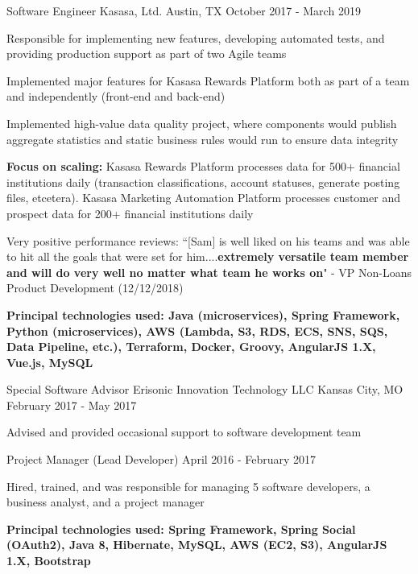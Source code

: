 \begin{cventries}
  \cventry
    {Software Engineer} %
    {Kasasa, Ltd.} %
    {Austin, TX} %
    {October 2017 - March 2019} %
    {
      \begin{cvitems} %
         \item{Responsible for implementing new features, developing automated tests, and providing production support as part of two Agile teams}
 \item{Implemented major features for Kasasa Rewards Platform both as part of a team and independently (front-end and back-end)}
 \item{Implemented high-value data quality project, where components would publish aggregate statistics and static business rules would run to ensure data integrity}
 \item{\textbf{Focus on scaling:} Kasasa Rewards Platform processes data for 500+ financial institutions daily (transaction classifications, account statuses, generate posting files, etcetera). Kasasa Marketing Automation Platform processes customer and prospect data for 200+ financial institutions daily}
 \item{Very positive performance reviews: ``[Sam] is well liked on his teams and was able to hit all the goals that were set for him....\textbf{extremely versatile team member and will do very well no matter what team he works on}" - VP Non-Loans Product Development (12/12/2018)}
 \item{\textbf{Principal technologies used: Java (microservices), Spring Framework, Python (microservices), AWS (Lambda, S3, RDS, ECS, SNS, SQS, Data Pipeline, etc.), Terraform, Docker, Groovy, AngularJS 1.X, Vue.js, MySQL}}
      \end{cvitems}
    }

  \cventry
    {Special Software Advisor} %
    {Erisonic Innovation Technology LLC} %
    {Kansas City, MO} %
    {February 2017 - May 2017} %
    {
      \begin{cvitems} %
       \item {Advised and provided occasional support to software development team}
      \end{cvitems}
    }
    
      \cventry
    {Project Manager (Lead Developer)} %
    {} %
    {} %
    {April 2016 - February 2017} %
    {
      \begin{cvitems} %
         \item{Hired, trained, and was responsible for managing 5 software developers, a business analyst, and a project manager}
 \item{\textbf{Principal technologies used: Spring Framework, Spring Social (OAuth2), Java 8, Hibernate,
MySQL, AWS (EC2, S3), AngularJS 1.X, Bootstrap}}
      \end{cvitems}
    }


\end{cventries}

